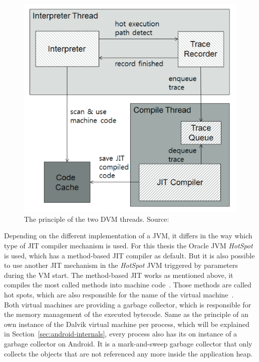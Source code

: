 \begin{figure}[h]
\begin{center}
\includegraphics[scale=0.5]{images/dvm-threads.png} 
\caption{The principle of the two DVM threads. Source:\cite{oh2012evaluation}}
\label{fig:dvm-threads}
\end{center}
\end{figure}
\newpage
Depending on the different implementation of a JVM, it differs in the way which type of JIT compiler mechanism is used.
For this thesis the Oracle JVM \textit{HotSpot} is used, which has a method-based JIT compiler as default.
But it is also possible to use another JIT mechanism in the \textit{HotSpot} JVM triggered by parameters during the VM start.
The method-based JIT works as mentioned above, it compiles the most called methods into machine code~\cite{kotzmann2008design}.
Those methods are called hot spots, which are also responsible for the name of the virtual machine~\cite{paleczny2001java}.
\\
Both virtual machines are providing a garbage collector, which is responsible for the memory management of the executed bytecode.
Same as the principle of an own instance of the Dalvik virtual machine per process, which will be explained in Section~\ref{sec:android-internals}, every process also has its on instance of a garbage collector on Android.
It is a mark-and-sweep garbage collector that only collects the objects that are not referenced any more inside the application heap.
